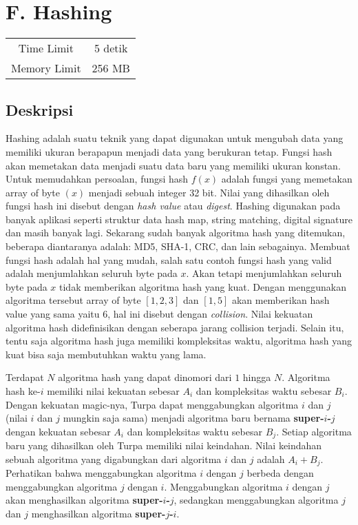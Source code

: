 \documentclass{article}
\begin{document}
\section*{\hfil F. Hashing\hfil}

\begin{center}
\begin{tabular}{ |cc| } 
 \hline
 Time Limit & 5 detik \\ 
 Memory Limit & 256 MB \\
 \hline
\end{tabular}
\end{center}

\subsection*{Deskripsi}

\par Hashing adalah suatu teknik yang dapat digunakan untuk mengubah data yang memiliki ukuran berapapun menjadi data yang berukuran tetap. Fungsi hash akan memetakan data menjadi suatu data baru yang memiliki ukuran konstan. Untuk memudahkan persoalan, fungsi hash $f(x)$ adalah fungsi yang memetakan array of byte $(x)$ menjadi sebuah integer 32 bit. Nilai yang dihasilkan oleh fungsi hash ini disebut dengan \textit{hash value} atau \textit{digest}. Hashing digunakan pada banyak aplikasi seperti struktur data hash map, string matching, digital signature dan masih banyak lagi. Sekarang sudah banyak algoritma hash yang ditemukan, beberapa diantaranya adalah: MD5, SHA-1, CRC, dan lain sebagainya. Membuat fungsi hash adalah hal yang mudah, salah satu contoh fungsi hash yang valid adalah menjumlahkan seluruh byte pada $x$. Akan tetapi menjumlahkan seluruh byte pada $x$ tidak memberikan algoritma hash yang kuat. Dengan menggunakan algoritma tersebut array of byte $[1,2,3]$ dan $[1,5]$ akan memberikan hash value yang sama yaitu $6$, hal ini disebut dengan \textit{collision}. Nilai kekuatan algoritma hash didefinisikan dengan seberapa jarang collision terjadi. Selain itu, tentu saja algoritma hash juga memiliki kompleksitas waktu, algoritma hash yang kuat bisa saja membutuhkan waktu yang lama.

\par Terdapat $N$ algoritma hash yang dapat dinomori dari $1$ hingga $N$. Algoritma hash ke-$i$ memiliki nilai kekuatan sebesar $A_i$ dan kompleksitas waktu sebesar $B_i$. Dengan kekuatan magic-nya, Turpa dapat menggabungkan algoritma $i$ dan $j$ (nilai $i$ dan $j$ mungkin saja sama) menjadi algoritma baru bernama \textbf{super-$i$-$j$} dengan kekuatan sebesar $A_i$ dan kompleksitas waktu sebesar $B_j$. Setiap algoritma baru yang dihasilkan oleh Turpa memiliki nilai keindahan. Nilai keindahan sebuah algoritma yang digabungkan dari algoritma $i$ dan $j$ adalah $A_i + B_j$. Perhatikan bahwa menggabungkan algoritma $i$ dengan $j$ berbeda dengan menggabungkan algoritma $j$ dengan $i$. Menggabungkan algoritma $i$ dengan $j$ akan menghasilkan algoritma \textbf{super-$i$-$j$}, sedangkan menggabungkan algoritma $j$ dan $j$ menghasilkan algoritma \textbf{super-$j$-$i$}.
\end{document}
